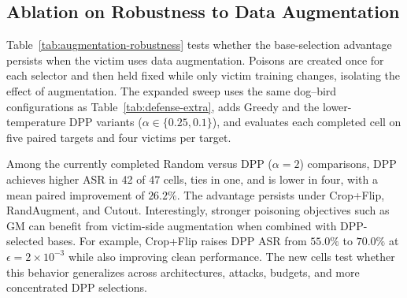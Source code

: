 \subsection{Ablation on Robustness to Data Augmentation}
\label{sec:augmentation-robustness}

Table~\ref{tab:augmentation-robustness} tests whether the base-selection
advantage persists when the victim uses data augmentation.  Poisons are
created once for each selector and then held fixed while only victim training
changes, isolating the effect of augmentation.  The expanded sweep uses the
same dog--bird configurations as Table~\ref{tab:defense-extra}, adds Greedy and
the lower-temperature DPP variants ($\alpha\in\{0.25,0.1\}$), and evaluates
each completed cell on five paired targets and four victims per target.

Among the currently completed Random versus DPP ($\alpha=2$) comparisons, DPP
achieves higher ASR in 42 of 47 cells, ties in one, and is lower in four, with
a mean paired improvement of $26.2\%$.  The advantage persists under Crop+Flip,
RandAugment, and Cutout.  Interestingly, stronger poisoning objectives such as
GM can benefit from victim-side augmentation when combined with DPP-selected
bases.  For example, Crop+Flip raises DPP ASR from $55.0\%$ to $70.0\%$ at
$\epsilon=2{\times}10^{-3}$ while also improving clean performance.  The new
cells test whether this behavior generalizes across architectures, attacks,
budgets, and more concentrated DPP selections.

